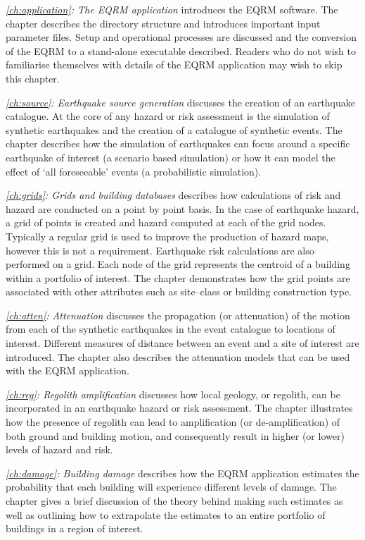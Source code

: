 \textit{\cref{ch:application}: The EQRM application} introduces
the EQRM software. The chapter describes the directory structure
and introduces important input parameter files. Setup and
operational processes are discussed and the conversion of the EQRM
to a stand-alone executable described. Readers who do not wish to
familiarise themselves with details of the EQRM application may
wish to skip this chapter.

\textit{\cref{ch:source}: Earthquake source generation} discusses
the creation of an earthquake catalogue. At the core of any hazard
or risk assessment is the simulation of synthetic earthquakes and
the creation of a catalogue of synthetic events. The chapter
describes how the simulation of earthquakes can focus around a
specific earthquake of interest (a scenario based simulation) or
how it can model the effect of `all foreseeable' events (a
probabilistic simulation).

\textit{\cref{ch:grids}: Grids and building databases} describes
how calculations of risk and hazard are conducted on a point by
point basis. In the case of earthquake hazard,  a grid of points
is created and hazard computed at each of the grid nodes.
Typically a regular grid is used to improve the production of
hazard maps, however this is not a requirement. Earthquake risk
calculations are also performed on a grid. Each node of the grid
represents the centroid of a building within a portfolio of
interest. The chapter demonstrates how the grid points are
associated with other attributes such as site--class or building
construction type.

\textit{\cref{ch:atten}: Attenuation} discusses the propagation
(or attenuation) of the motion from each of the synthetic
earthquakes in the event catalogue to locations of interest.
Different measures of distance between an event and a site of
interest are introduced. The chapter also describes the
attenuation models that can be used with the EQRM application.

\textit{\cref{ch:reg}: Regolith amplification} discusses how local
geology, or regolith, can be incorporated in an earthquake hazard
or risk assessment. The chapter illustrates how the presence of
regolith can lead to amplification (or de-amplification) of both
ground and building motion, and consequently result in higher (or
lower) levels of hazard and risk.

\textit{\cref{ch:damage}: Building damage} describes how the EQRM
application estimates the probability that each building will
experience different levels of damage. The chapter gives a brief
discussion of the theory behind making such estimates as well as
outlining how to extrapolate the estimates to an entire portfolio
of buildings in a region of interest.

